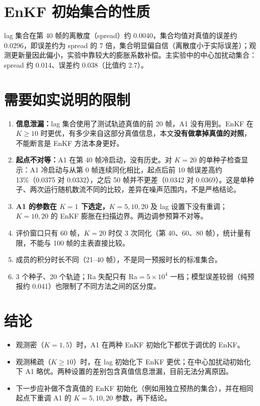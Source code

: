 \documentclass[10.5pt,a4paper]{article}
\begin{document}
\section{EnKF 初始集合的性质}
lag 集合在第 40 帧的离散度（spread）约 0.0040，集合均值对真值的误差约 0.0296，即误差约为 spread 的 7 倍，集合明显偏自信（离散度小于实际误差）；观测更新量因此偏小，实验中靠较大的膨胀系数补偿。主实验中的中心加扰动集合：spread 约 0.014、误差约 0.038（比值约 2.7）。

\section{需要如实说明的限制}
\begin{enumerate}
\item \textbf{信息泄漏：}lag 集合使用了测试轨迹真值的前 20 帧，A1 没有用到。EnKF 在 $K\ge10$ 时更优，有多少来自这部分真值信息，本文\textbf{没有做拿掉真值的对照}，不能断言是 EnKF 方法本身更好。
\item \textbf{起点不对等：}A1 在第 40 帧冷启动，没有历史。对 $K=20$ 的单种子检查显示：A1 冷启动与从第 0 帧连续同化相比，起点后前 10 帧误差高约 13\%（0.0375 对 0.0332），之后 50 帧并不更差（0.0342 对 0.0369）。这是单种子、两次运行随机数流不同的比较，差异在噪声范围内，不是严格结论。
\item \textbf{A1 的参数在 $K=1$ 下选定，}$K=5,10,20$ 及 lag 设置下没有重调；$K=10,20$ 的 EnKF 膨胀在扫描边界。两边调参预算不对等。
\item 评价窗口只有 60 帧，$K=20$ 时仅 3 次同化（第 40、60、80 帧），统计量有限，不能与 100 帧的主表直接比较。
\item 成员的积分时长不同（21--40 帧），不是同一预报时长的标准集合。
\item 3 个种子、20 个轨迹；Ra 失配只有 Ra$=5\times10^4$ 一档；模型误差较弱（纯预报约 0.041）也限制了不同方法之间的区分度。
\end{enumerate}

\section{结论}
\begin{itemize}
\item 观测密（$K=1,5$）时，A1 在两种 EnKF 初始化下都优于调优的 EnKF。
\item 观测稀疏（$K\ge10$）时，在 lag 初始化下 EnKF 更优；在中心加扰动初始化下 A1 略优。两种设置的差别包含真值信息泄漏，目前无法分离原因。
\item 下一步应补做不含真值的 EnKF 初始化（例如用独立预热的集合），并在相同起点下重调 A1 的 $K=5,10,20$ 参数，再下结论。
\end{itemize}
\end{document}

